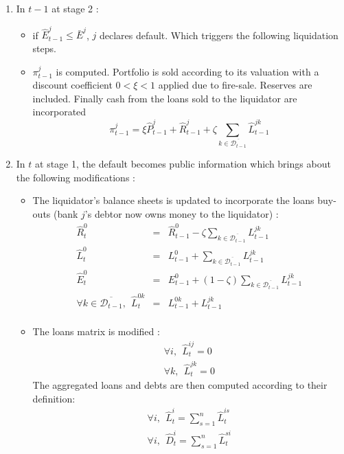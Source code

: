 \documentclass{article}
\newcommand{\wh}{\widehat}
\begin{document}
 \begin{enumerate}
 
    \item In $t-1$ at stage 2 :
    \begin{itemize}
        \item if $\widehat{E}_{t-1}^j \leq \bar{E}^j$, $j$ declares default. Which triggers the following liquidation steps.
        \item $\pi_{t-1}^j$ is computed. Portfolio is sold according to its valuation with a discount coefficient $0 < \xi < 1$ applied due to fire-sale. Reserves are included. Finally cash from the loans sold to the liquidator are incorporated 
        $$\pi_{t-1}^j = \xi \widehat{P}_{t-1}^j + \widehat{R}_{t-1}^j + \zeta \sum_{k \in \overline{\mathcal{D}_{t-1}}} \wh L^{jk}_{t-1} $$ 
    \end{itemize}
    \item In $t$ at stage 1, the default becomes public information which brings about the following modifications : 
    \begin{itemize}
    
        \item The liquidator's balance sheets is updated to incorporate the loans buy-outs (bank $j$'s debtor now owns money to the liquidator) :
        \begin{eqnarray*}
        \wh R_t^0 &=& \wh R_{t-1}^0 - \zeta \sum_{k \in \overline{\mathcal{D}_{t-1}}} L^{jk}_{t-1} \\
        \wh L_t^0 &=& L_{t-1}^0 + \sum_{k \in \overline{\mathcal{D}_{t-1}}} L^{jk}_{t-1} \\
        \wh E_t^0 &=& E_{t-1}^0 + (1 -\zeta)\sum_{k \in \overline{\mathcal{D}_{t-1}}} L^{jk}_{t-1} \\
        \forall k \in \overline{\mathcal{D}_{t-1}},~~\wh L_t^{0k} &=& L_{t-1}^{0k} + L_{t-1}^{jk}\\
        \end{eqnarray*}
    
        \item The loans matrix is modified :
        \begin{eqnarray*}
        \forall i,~~ \wh L_t^{ij} = 0 \\
        \forall k,~~ \wh L_t^{jk} = 0
        \end{eqnarray*}
        The aggregated loans and debts are then computed according to their definition:
        \begin{eqnarray*}
        \forall i,~~ \wh L_t^i = \sum_{s=1}^n \wh L_t^{is} \\
        \forall i,~~ \wh D_t^i = \sum_{s=1}^n \wh L_t^{si}
        \end{eqnarray*}
        

\end{itemize}
\end{enumerate}
\end{document}
